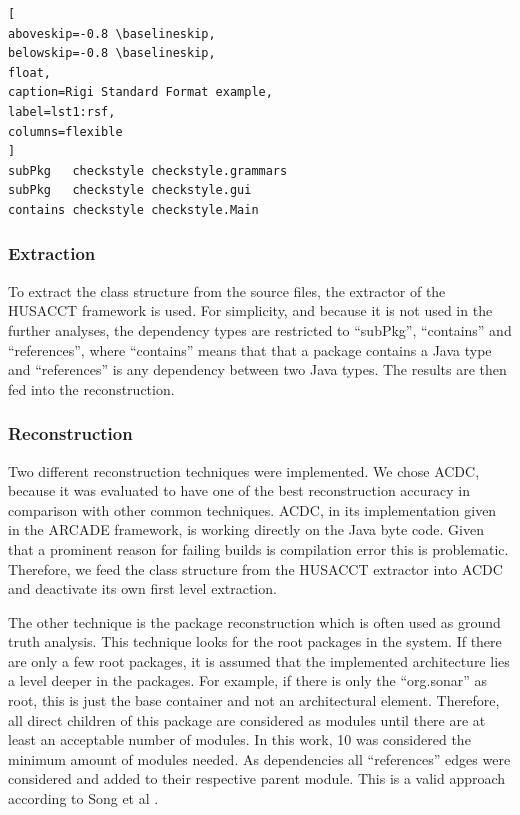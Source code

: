 \documentclass[conference]{IEEEtran}
\begin{document}
\begin{lstlisting}[
aboveskip=-0.8 \baselineskip,
belowskip=-0.8 \baselineskip,
float,
caption=Rigi Standard Format example,
label=lst1:rsf,
columns=flexible
]
subPkg   checkstyle checkstyle.grammars
subPkg   checkstyle checkstyle.gui
contains checkstyle checkstyle.Main
\end{lstlisting}



\subsubsection{Extraction}

To extract the class structure from the source files, the extractor of the HUSACCT framework is used. For simplicity, and because it is not used in the further analyses, the dependency types are restricted to ``subPkg'', ``contains'' and ``references'', where ``contains'' means that that a package contains a Java type and ``references'' is any dependency between two Java types. The results are then fed into the reconstruction.

\subsubsection{Reconstruction}

Two different reconstruction techniques were implemented. We chose ACDC, because it was evaluated to have one of the best reconstruction accuracy \cite{arcRec-comparison} in comparison with other common techniques. ACDC, in its implementation given in the ARCADE framework, is working directly on the Java byte code. Given that a prominent reason for failing builds is compilation error this is problematic. Therefore, we feed the class structure from the HUSACCT extractor into ACDC and deactivate its own first level extraction.

The other technique is the package reconstruction which is often used as ground truth analysis.
This technique looks for the root packages in the system. If there are only a few root packages, it is assumed that the implemented architecture lies a level deeper in the packages. For example, if there is only the ``org.sonar'' as root, this is just the base container and not an architectural element. Therefore, all direct children of this package are considered as modules until there are at least an acceptable number of modules. In this work, 10 was considered the minimum amount of modules needed. As dependencies all ``references'' edges were considered and added to their respective parent module. This is a valid approach according to Song et al \cite{ArcAsGraph}. 
\end{document}
